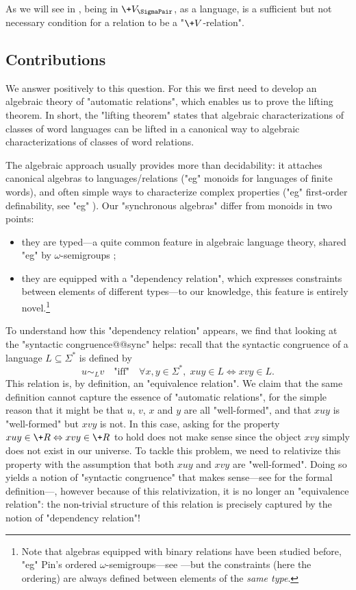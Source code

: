As we will see in , being in $\+V_{\SigmaPair}$, as a language,
is a sufficient but not necessary condition for a relation to be a "$\+V$-relation".

\subsection{Contributions}

We answer positively to this question.
For this we first need to develop an algebraic theory of "automatic relations",
which enables us to prove the lifting theorem. In short, the "lifting theorem" states that algebraic characterizations of classes of word languages can be lifted in a canonical way to algebraic characterizations of classes of word relations.

The algebraic approach usually provides more than decidability: it attaches
canonical algebras to languages/relations ("eg" monoids for languages of finite words), and often simple ways to characterize complex properties ("eg" first-order definability, see "eg" \cite[Theorem 2.6, p.~40]{Bojanczyk2020MSO}).
Our "synchronous algebras" differ from monoids in two points:
\begin{itemize}
	\item they are typed---a quite common feature in algebraic language theory, shared "eg" by $\omega$-semigroups \cite[\S 4.1, p.~91]{Perrin2004InfiniteWords};
	\item they are equipped with a "dependency relation", which expresses constraints between 
	elements of different types---to our knowledge, this feature is entirely novel.\footnote{Note that algebras equipped with binary relations have been studied before, "eg" Pin's ordered 
	$\omega$-semigroups---see \cite[\S 2.4, p.~7]{Pin1998PositiveVarieties}---but the constraints (here the ordering) are always defined between elements of the \emph{same type}.}
\end{itemize}
To understand how this "dependency relation" appears, we find that
looking at the "syntactic congruence@@sync" helps:
recall that the syntactic congruence of a language $L \subseteq \Sigma^*$
is defined by
\[
	u \sim_{L} v \quad\text{"iff"}\quad
	\forall x,y\in \Sigma^*,\; xuy \in L \Leftrightarrow xvy \in L.
\]
This relation is, by definition, an "equivalence relation".
We claim that the same definition cannot capture the essence of
"automatic relations", for the simple reason that it might be that
$u$, $v$, $x$ and $y$ are all "well-formed", and that
$xuy$ is "well-formed" but $xvy$ is not. In this case, 
asking for the property $xuy \in \+R \Leftrightarrow xvy \in \+R$ 
to hold does not make sense since the object $xvy$ simply does not exist
in our universe. To tackle this problem, we need to relativize this
property with the assumption that both $xuy$ and $xvy$ are "well-formed".
Doing so yields a notion of "syntactic congruence" that
makes sense---see  for the formal definition---,
however because of this relativization, it is no longer an "equivalence relation":
the non-trivial structure of this relation is precisely captured by the notion
of "dependency relation"!

